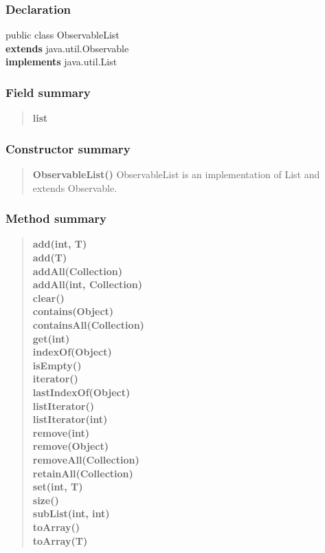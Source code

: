 {{\subsubsection{Declaration}{
\small public class ObservableList
\\ {\bf extends} java.util.Observable
\\ {\bf implements} 
java.util.List}
\subsubsection{Field summary}{
\begin{verse}
{\bf list} \\
\end{verse}
}
\subsubsection{Constructor summary}{
\begin{verse}
{\bf ObservableList()} ObservableList is an implementation of List and extends Observable.\\
\end{verse}
}
\subsubsection{Method summary}{
\begin{verse}
{\bf add(int, T)} \\
{\bf add(T)} \\
{\bf addAll(Collection)} \\
{\bf addAll(int, Collection)} \\
{\bf clear()} \\
{\bf contains(Object)} \\
{\bf containsAll(Collection)} \\
{\bf get(int)} \\
{\bf indexOf(Object)} \\
{\bf isEmpty()} \\
{\bf iterator()} \\
{\bf lastIndexOf(Object)} \\
{\bf listIterator()} \\
{\bf listIterator(int)} \\
{\bf remove(int)} \\
{\bf remove(Object)} \\
{\bf removeAll(Collection)} \\
{\bf retainAll(Collection)} \\
{\bf set(int, T)} \\
{\bf size()} \\
{\bf subList(int, int)} \\
{\bf toArray()} \\
{\bf toArray(T\lbrack \rbrack )} \\
\end{verse}
}
}}
